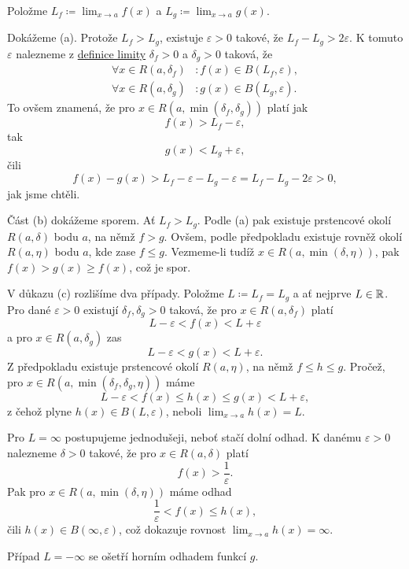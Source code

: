 \begin{thmproof}
 Položme $L_f \coloneqq \lim_{x \to a} f(x)$ a $L_g \coloneqq \lim_{x \to a}
 g(x)$.

 Dokážeme (a). Protože $L_f > L_g$, existuje $\varepsilon > 0$ takové, že $L_f -
 L_g > 2\varepsilon$. K tomuto $\varepsilon$ nalezneme z
 \hyperref[def:oboustranna-limita-funkce]{definice limity} $\delta_f > 0$ a
 $\delta_g > 0$ taková, že
 \begin{align*}
  \forall x \in R(a,\delta_f) &: f(x) \in B(L_f,\varepsilon),\\
  \forall x \in R(a,\delta_g)&: g(x) \in B(L_g,\varepsilon).
 \end{align*}
 To ovšem znamená, že pro $x \in R(a,\min(\delta_f,\delta_g))$ platí jak
 \[
  f(x) > L_f - \varepsilon,
 \]
 tak
 \[
  g(x) < L_g + \varepsilon,
 \]
 čili
 \[
  f(x) - g(x) > L_f - \varepsilon - L_g - \varepsilon = L_f - L_g - 2\varepsilon
  > 0,
 \]
 jak jsme chtěli.

 Část (b) dokážeme sporem. Ať $L_f > L_g$. Podle (a) pak existuje prstencové
 okolí $R(a,\delta)$ bodu $a$, na němž $f > g$. Ovšem, podle předpokladu
 existuje rovněž okolí $R(a,\eta)$ bodu $a$, kde zase $f \leq g$. Vezmeme-li
 tudíž $x \in R(a,\min(\delta,\eta))$, pak $f(x) > g(x) \geq f(x)$, což je spor.

 V důkazu (c) rozlišíme dva případy. Položme $L \coloneqq L_f = L_g$ a ať
 nejprve $L \in \mathbb{R}$. Pro dané $\varepsilon>0$ existují $\delta_f,\delta_g>0$
 taková, že pro $x \in R(a,\delta_f)$ platí
 \[
  L - \varepsilon< f(x) < L + \varepsilon
 \]
 a pro $x \in R(a,\delta_g)$ zas
 \[
  L - \varepsilon < g(x) < L + \varepsilon.
 \]
 Z předpokladu existuje prstencové okolí $R(a,\eta)$, na němž $f \leq h \leq g$.
 Pročež, pro $x \in R(a,\min(\delta_f,\delta_g,\eta))$ máme
 \[
  L - \varepsilon < f(x) \leq h(x) \leq g(x) < L + \varepsilon,
 \]
 z čehož plyne $h(x) \in B(L,\varepsilon)$, neboli $\lim_{x \to a} h(x) = L$.

 Pro $L = \infty$ postupujeme jednodušeji, neboť stačí dolní odhad. K danému
 $\varepsilon>0$ nalezneme $\delta>0$ takové, že pro $x \in R(a,\delta)$ platí
 \[
  f(x) > \frac{1}{\varepsilon}.
 \]
 Pak pro $x \in R(a,\min(\delta,\eta))$ máme odhad
 \[
  \frac{1}{\varepsilon} < f(x) \leq h(x),
 \]
 čili $h(x) \in B(\infty,\varepsilon)$, což dokazuje rovnost $\lim_{x \to a}
 h(x) = \infty$. 

 Případ $L = -\infty$ se ošetří horním odhadem funkcí $g$.
\end{thmproof}

